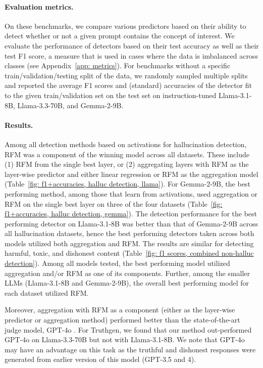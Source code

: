 \paragraph{Evaluation metrics.} On these benchmarks, we compare various predictors based on their ability to detect whether or not a given prompt contains the concept of interest.  We evaluate the performance of detectors based on their test accuracy as well as their test F1 score, a measure that is used in cases where the data is imbalanced across classes (see Appendix~\ref{app: metrics}).  For benchmarks without a specific train/validation/testing split of the data, we randomly sampled multiple splits and reported the average F1 scores and (standard) accuracies of the detector fit to the given train/validation set on the test set on instruction-tuned Llama-3.1-8B, Llama-3.3-70B, and Gemma-2-9B. 







\paragraph{Results.} Among all detection methods based on activations for hallucination detection, RFM was a component of the winning model across all datasets. These include (1) RFM from the single best layer, or (2) aggregating layers with RFM as the layer-wise predictor and either linear regression or RFM as the aggregation model (Table~\ref{fig: f1+accuracies, halluc detection, llama}). For Gemma-2-9B, the best performing method, among those that learn from activations, used aggregation or RFM on the single best layer on three of the four datasets (Table~\ref{fig: f1+accuracies, halluc detection, gemma}). The detection performance for the best performing detector on Llama-3.1-8B was better than that of Gemma-2-9B across all hallucination datasets, hence the best performing detectors taken across both models utilized both aggregation and RFM. The results are similar for detecting harmful, toxic, and dishonest content (Table~\ref{fig: f1 scores, combined non-halluc detection}). Among all models tested, the best performing model utilized aggregation and/or RFM as one of its components. Further, among the smaller LLMs (Llama-3.1-8B and Gemma-2-9B), the overall best performing model for each dataset utilized RFM. 

Moreover, aggregation with RFM as a component (either as the layer-wise predictor or aggregation method) performed better than the state-of-the-art judge model, GPT-4o \citep{gpt4o}. For Truthgen, we found that our method out-performed GPT-4o on Llama-3.3-70B but not with Llama-3.1-8B. We note that GPT-4o may have an advantage on this task as the truthful and dishonest responses were generated from earlier version of this model (GPT-3.5 and 4).  

